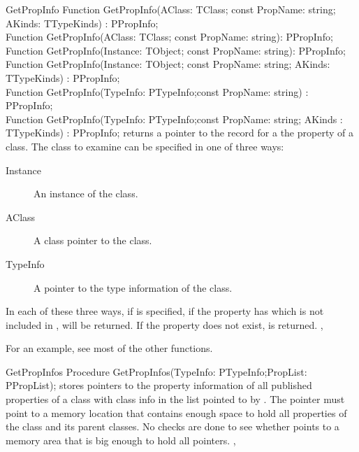 \begin{function}{GetPropInfo}
\Declaration
Function GetPropInfo(AClass: TClass; const PropName: string; AKinds: TTypeKinds) : PPropInfo;\\
Function GetPropInfo(AClass: TClass; const PropName: string): PPropInfo;\\
Function GetPropInfo(Instance: TObject; const PropName: string): PPropInfo;\\
Function GetPropInfo(Instance: TObject; const PropName: string; AKinds: TTypeKinds) : PPropInfo;\\
Function GetPropInfo(TypeInfo: PTypeInfo;const PropName: string) : PPropInfo;\\
Function GetPropInfo(TypeInfo: PTypeInfo;const PropName: string; AKinds : TTypeKinds) : PPropInfo;
\Description
{} returns a pointer to the  record for a the 
 property of a class. The class to examine can be specified 
in one of three ways:
\begin{description}
\item[Instance] An instance of the class.
\item[AClass] A class pointer to the class.
\item[TypeInfo] A pointer to the type information of the class.
\end{description}
In each of these three ways, if  is specified, if the property 
has  which is not included in ,  will be
returned.
\Errors
If the property  does not exist,  is returned.
\SeeAlso
{},
\end{function}

For an example, see most of the other functions.

\begin{procedure}{GetPropInfos}
\Declaration
Procedure GetPropInfos(TypeInfo: PTypeInfo;PropList: PPropList);
\Description
{} stores pointers to the property information of all published
properties of a class with class info  in the list pointed to by
. The  pointer must point to a memory location that
contains enough space to hold all properties of the class and its parent classes.
\Errors
No checks are done to see whether  points to a memory area that 
is big enough to hold all pointers.
\SeeAlso
{},
\end{procedure}

